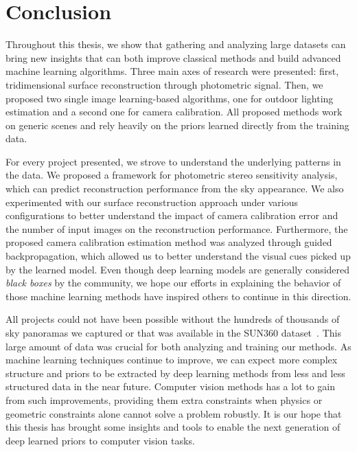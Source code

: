 \chapter*{Conclusion}         %


Throughout this thesis, we show that gathering and analyzing large datasets can bring new insights that can both improve classical methods and build advanced machine learning algorithms. Three main axes of research were presented: first, tridimensional surface reconstruction through photometric signal. Then, we proposed two single image learning-based algorithms, one for outdoor lighting estimation and a second one for camera calibration. All proposed methods work on generic scenes and rely heavily on the priors learned directly from the training data. 

For every project presented, we strove to understand the underlying patterns in the data. We proposed a framework for photometric stereo sensitivity analysis, which can predict reconstruction performance from the sky appearance. We also experimented with our surface reconstruction approach under various configurations to better understand the impact of camera calibration error and the number of input images on the reconstruction performance. Furthermore, the proposed camera calibration estimation method was analyzed through guided backpropagation, which allowed us to better understand the visual cues picked up by the learned model. Even though deep learning models are generally considered \emph{black boxes} by the community, we hope our efforts in explaining the behavior of those machine learning methods have inspired others to continue in this direction.

All projects could not have been possible without the hundreds of thousands of sky panoramas we captured or that was available in the SUN360 dataset~\cite{xiao-cvpr-12}. This large amount of data was crucial for both analyzing and training our methods. As machine learning techniques continue to improve, we can expect more complex structure and priors to be extracted by deep learning methods from less and less structured data in the near future. Computer vision methods has a lot to gain from such improvements, providing them extra constraints when physics or geometric constraints alone cannot solve a problem robustly. It is our hope that this thesis has brought some insights and tools to enable the next generation of deep learned priors to computer vision tasks. 
